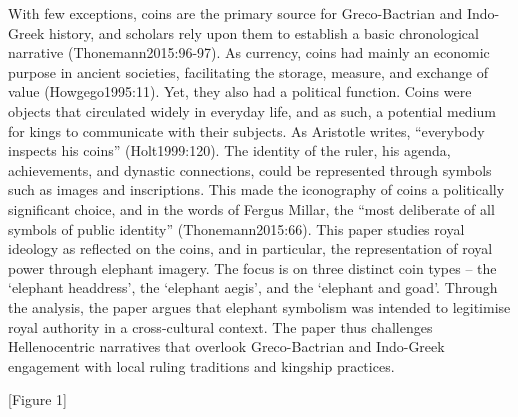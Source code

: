\documentclass{ijsra}
\begin{document}
With few exceptions, coins are the primary source for Greco-Bactrian and Indo-Greek history, and scholars rely upon them to establish
a basic chronological narrative (Thonemann2015:96-97).
As currency, coins had mainly an economic purpose in ancient societies, facilitating the storage, measure, and exchange of value
(Howgego1995:11).
Yet, they also had a political function.
Coins were objects that circulated widely in everyday life, and as such, a potential medium for kings to communicate with their subjects.
As Aristotle writes, “everybody inspects his coins” (Holt1999:120).
The identity of the ruler, his agenda, achievements, and dynastic connections, could be represented through symbols such as images
and inscriptions.
This made the iconography of coins a politically significant choice, and in the words of Fergus Millar, the “most deliberate of all
symbols of public identity” (Thonemann2015:66).
This paper studies royal ideology as reflected on the coins, and in particular, the representation of royal power through elephant imagery.
The focus is on three distinct coin types – the ‘elephant headdress’, the ‘elephant aegis’, and the ‘elephant and goad’.
Through the analysis, the paper argues that elephant symbolism was intended to legitimise royal authority in a cross-cultural context.
The paper thus challenges Hellenocentric narratives that overlook Greco-Bactrian and Indo-Greek engagement with local ruling traditions
and kingship practices.

[Figure 1]
\end{document}
